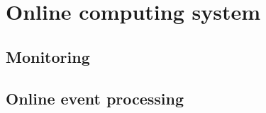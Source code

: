 
\section{Online computing system \label{sec:online}}
\subsection{Monitoring \label{sec:onlinemonitoring}}
\subsection{Online event processing \label{sec:onlineprocessing}}

